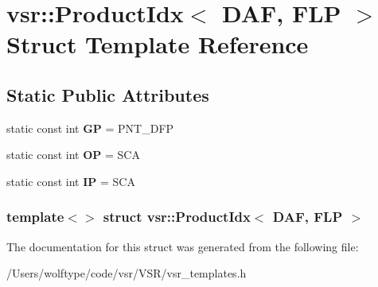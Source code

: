 \hypertarget{structvsr_1_1_product_idx_3_01_d_a_f_00_01_f_l_p_01_4}{\section{vsr\-:\-:Product\-Idx$<$ D\-A\-F, F\-L\-P $>$ Struct Template Reference}
\label{structvsr_1_1_product_idx_3_01_d_a_f_00_01_f_l_p_01_4}
}
\subsection*{Static Public Attributes}
\begin{DoxyCompactItemize}
\item 
\hypertarget{structvsr_1_1_product_idx_3_01_d_a_f_00_01_f_l_p_01_4_a664dcf49afb299e0892edaf5d598ac60}{static const int {\bfseries G\-P} = P\-N\-T\-\_\-\-D\-F\-P}\label{structvsr_1_1_product_idx_3_01_d_a_f_00_01_f_l_p_01_4_a664dcf49afb299e0892edaf5d598ac60}

\item 
\hypertarget{structvsr_1_1_product_idx_3_01_d_a_f_00_01_f_l_p_01_4_a3b9400a4587d7692bb969b03e9f0922f}{static const int {\bfseries O\-P} = S\-C\-A}\label{structvsr_1_1_product_idx_3_01_d_a_f_00_01_f_l_p_01_4_a3b9400a4587d7692bb969b03e9f0922f}

\item 
\hypertarget{structvsr_1_1_product_idx_3_01_d_a_f_00_01_f_l_p_01_4_a9d304f31b8a95fa7bcd047afb8cdd296}{static const int {\bfseries I\-P} = S\-C\-A}\label{structvsr_1_1_product_idx_3_01_d_a_f_00_01_f_l_p_01_4_a9d304f31b8a95fa7bcd047afb8cdd296}

\end{DoxyCompactItemize}
\subsubsection*{template$<$$>$ struct vsr\-::\-Product\-Idx$<$ D\-A\-F, F\-L\-P $>$}



The documentation for this struct was generated from the following file\-:\begin{DoxyCompactItemize}
\item 
/\-Users/wolftype/code/vsr/\-V\-S\-R/vsr\-\_\-templates.\-h\end{DoxyCompactItemize}
